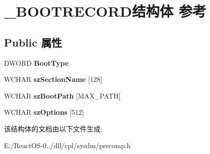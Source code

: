 \hypertarget{struct___b_o_o_t_r_e_c_o_r_d}{}\section{\+\_\+\+B\+O\+O\+T\+R\+E\+C\+O\+R\+D结构体 参考}
\label{struct___b_o_o_t_r_e_c_o_r_d}
\subsection*{Public 属性}
\begin{DoxyCompactItemize}
\item 
\mbox{\label{struct___b_o_o_t_r_e_c_o_r_d_afc152cc9cb66c0baa9f437f53459bd2f}} 
D\+W\+O\+RD {\bfseries Boot\+Type}
\item 
\mbox{\label{struct___b_o_o_t_r_e_c_o_r_d_a750e88470478d4c30e241dece9f7a5f3}} 
W\+C\+H\+AR {\bfseries sz\+Section\+Name} \mbox{[}128\mbox{]}
\item 
\mbox{\label{struct___b_o_o_t_r_e_c_o_r_d_a5d40177438946b48f1a7a1371ce16f72}} 
W\+C\+H\+AR {\bfseries sz\+Boot\+Path} \mbox{[}M\+A\+X\+\_\+\+P\+A\+TH\mbox{]}
\item 
\mbox{\label{struct___b_o_o_t_r_e_c_o_r_d_aa4530a7cfa6bc908e635434eb78f9748}} 
W\+C\+H\+AR {\bfseries sz\+Options} \mbox{[}512\mbox{]}
\end{DoxyCompactItemize}


该结构体的文档由以下文件生成\+:\begin{DoxyCompactItemize}
\item 
E\+:/\+React\+O\+S-\/0../dll/cpl/sysdm/precomp.\+h\end{DoxyCompactItemize}
